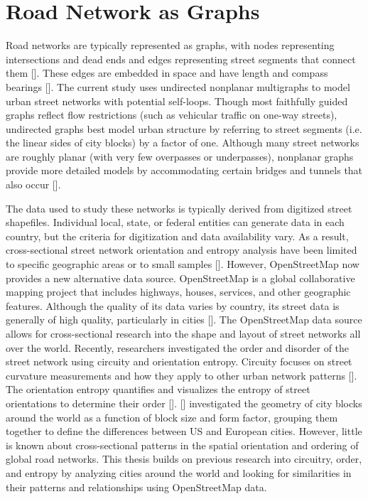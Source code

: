 \section{Road Network as Graphs}
Road networks are typically represented as graphs, with nodes representing intersections and dead ends and edges representing street segments that connect them [\cite{Barthelemy:2008, Cardillo:2006, Lin:2013, Marshall:2018, Porta:2006}]. These edges are embedded in space and have length and compass bearings [\cite{Barthelemy:2011}]. The current study uses undirected nonplanar multigraphs to model urban street networks with potential self-loops. Though most faithfully guided graphs reflect flow restrictions (such as vehicular traffic on one-way streets), undirected graphs best model urban structure by referring to street segments (i.e. the linear sides of city blocks) by a factor of one. Although many street networks are roughly planar (with very few overpasses or underpasses), nonplanar graphs provide more detailed models by accommodating certain bridges and tunnels that also occur [\cite{Boeing:2018, Eppstein:2008}].

The data used to study these networks is typically derived from digitized street shapefiles. Individual local, state, or federal entities can generate data in each country, but the criteria for digitization and data availability vary. As a result, cross-sectional street network orientation and entropy analysis have been limited to specific geographic areas or to small samples [\cite{Boeing:2019}]. However, OpenStreetMap now provides a new alternative data source. OpenStreetMap is a global collaborative mapping project that includes highways, houses, services, and other geographic features. Although the quality of its data varies by country, its street data is generally of high quality, particularly in cities [\cite{Barrington-Leigh:2017, Barron:2014, Zielstra:2013}]. The OpenStreetMap data source allows for cross-sectional research into the shape and layout of street networks all over the world. Recently, researchers investigated the order and disorder of the street network using circuity and orientation entropy. Circuity focuses on street curvature measurements and how they apply to other urban network patterns [\cite{Boeing:2019, Giacomin:2015, Levinson:2009}]. The orientation entropy quantifies and visualizes the entropy of street orientations to determine their order [\cite{Courtat:2011, Gudmundsson:2013, Mohajeri:2013, Mohajeri:2013:1, Mohajeri:2014, Mohajeri:2012}]. [\cite{Louf:2014}] investigated the geometry of city blocks around the world as a function of block size and form factor, grouping them together to define the differences between US and European cities. However, little is known about cross-sectional patterns in the spatial orientation and ordering of global road networks. This thesis builds on previous research into circuitry, order, and entropy by analyzing cities around the world and looking for similarities in their patterns and relationships using OpenStreetMap data.

